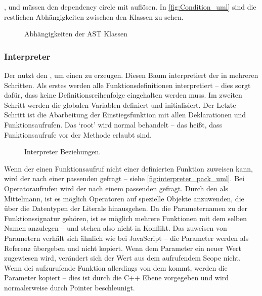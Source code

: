      ,  und  müssen den dependency circle mit  auflösen. In \autoref{fig:Condition_uml} sind die restlichen Abhängigkeiten zwischen den  Klassen zu sehen.
      \begin{figure}[H]
        \centering
        \caption{Abhängigkeiten der AST Klassen}
        \label{fig:Condition_uml}
      \end{figure}

    \subsubsection{Interpreter}
    \label{sssec:Interpreter}
      Der  nutzt den , um einen  zu erzeugen. Diesen Baum interpretiert der  in mehreren Schritten. Als erstes werden alle Funktionsdefinitionen interpretiert -- dies sorgt dafür, dass keine Definitionsreihenfolge eingehalten werden muss. Im zweiten Schritt werden die globalen Variablen definiert und initialisiert. Der Letzte Schritt ist die Abarbeitung der Einstiegsfunktion mit allen Deklarationen und Funktionsaufrufen. Das `root'  wird normal behandelt -- das heißt, dass Funktionsaufrufe vor der  Methode erlaubt sind.
      \begin{figure}[H]
        \centering
        \caption{Interpreter Beziehungen.}
        \label{fig:interpreter_pack_uml}
      \end{figure}

      Wenn der  einen Funktionsaufruf nicht einer definierten Funktion zuweisen kann, wird der  nach einer passenden  gefragt -- siehe \autoref{fig:interpreter_pack_uml}. Bei Operatoraufrufen wird der  nach einem passenden  gefragt. Durch den  als Mittelmann, ist es möglich Operatoren auf spezielle Objekte anzuwenden, die über die Datentypen der Literals hinausgehen. Da die Parameternamen zu der Funktionssignatur gehören, ist es möglich mehrere Funktionen mit dem selben Namen anzulegen --  und  stehen also nicht in Konflikt. Das zuweisen von Parametern verhält sich ähnlich wie bei JavaScript -- die Parameter werden als Referenz übergeben und nicht kopiert. Wenn dem Parameter ein neuer Wert zugewiesen wird, verändert sich der Wert aus dem aufrufendem Scope nicht. Wenn dei aufzurufende Funktion allerdings von dem  kommt, werden die Parameter kopiert -- dies ist durch die C++ Ebene vorgegeben und wird normalerweise durch Pointer beschleunigt.


